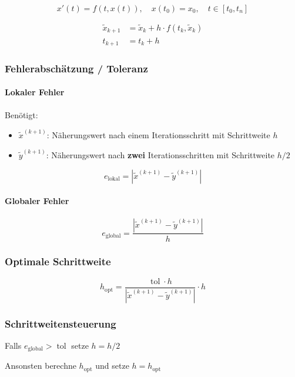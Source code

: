 \documentclass[a4paper, twoside]{article}
\begin{document}
\[x'(t) = f(t, x(t)),\quad x(t_{0}) = x_{0},\quad t \in [t_{0}, t_{n}]\]

\begin{align*}
  \tilde{x}_{k+1} &= \tilde{x}_{k} + h \cdot f(t_{k}, \tilde{x}_{k})\\[1em]
  t_{k+1} &= t_{k} + h
\end{align*}

\subsubsection{Fehlerabschätzung / Toleranz}

\paragraph{Lokaler Fehler}

Benötigt:

\begin{itemize}
\item \(\tilde{x}^{(k+1)}\): Näherungswert nach einem Iterationsschritt mit Schrittweite \(h\)
\item \(\tilde{y}^{(k+1)}\): Näherungswert nach \textbf{zwei} Iterationsschritten mit Schrittweite \(h/2\)
\end{itemize}

\[e_{\text{lokal}} = |\tilde{x}^{(k+1)} - \tilde{y}^{(k+1)}|\]

\paragraph{Globaler Fehler}

\[e_{\text{global}} = \frac{|\tilde{x}^{(k+1)} - \tilde{y}^{(k+1)}|}{h}\]

\subsubsection{Optimale Schrittweite}

\[h_{\text{opt}} = \frac{\operatorname{tol} \cdot h}{|\tilde{x}^{(k+1)} - \tilde{y}^{(k+1)}|} \cdot h\]

\subsubsection{Schrittweitensteuerung}

Falls \(e_{\text{global}} > \operatorname{tol}\) setze \(h = h/2\)

Ansonsten berechne \(h_{\text{opt}}\) und setze \(h = h_{\text{opt}}\)
\end{document}
